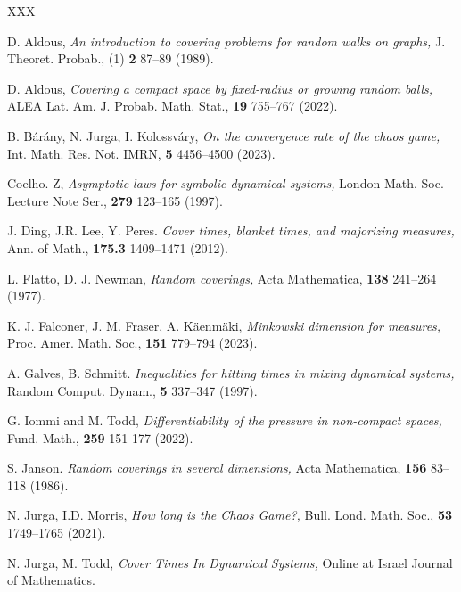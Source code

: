 \documentclass[11pt, reqno]{amsart}
\theoremstyle{plain}%
\theoremstyle{definition}
\theoremstyle{definition}
\numberwithin{equation}{section}
\begin{document}
\begin{thebibliography}{XXX}




D. Aldous, \emph{An introduction to covering problems for random walks on graphs,} J. Theoret. Probab., (1) \textbf{2} 87–89 (1989).

D. Aldous, \emph{Covering a compact space by fixed-radius or growing random balls,} ALEA Lat. Am. J. Probab.
Math. Stat., \textbf{19} 755–767 (2022).


B. Bárány, N. Jurga, I. Kolossváry, \emph{On the convergence rate of the chaos game,} Int. Math. Res. Not. IMRN, \textbf{5} 4456–4500 (2023).


Coelho. Z, \emph{Asymptotic laws for
symbolic dynamical systems,} London Math. Soc.
Lecture Note Ser.,  \textbf{279} 123–165 (1997).


J. Ding, J.R. Lee, Y. Peres. \emph{Cover times, blanket times, and majorizing measures,} Ann. of Math., \textbf{175.3} 1409–1471 (2012).

L. Flatto, D. J. Newman, \emph{Random coverings,} Acta Mathematica, \textbf{138} 241–264 (1977).


K. J. Falconer, J. M. Fraser, A. Käenmäki, \emph{Minkowski dimension for measures,} Proc. Amer. Math. Soc., \textbf{151} 779–794 (2023).


A. Galves, B. Schmitt. \emph{Inequalities for hitting times in mixing dynamical systems,} Random Comput. Dynam., \textbf{5} 337–347 (1997).


G. Iommi and M. Todd, \textit{Differentiability of the pressure in non-compact spaces,}  Fund. Math., \textbf{259} 151-177 (2022).


S. Janson. \emph{Random coverings in several dimensions,} Acta Mathematica, \textbf{156} 83–118 (1986).

N. Jurga, I.D. Morris, \emph{How long is the Chaos Game?,} Bull. Lond. Math. Soc., \textbf{53} 1749–1765 (2021).


N. Jurga, M. Todd, \emph{Cover Times In Dynamical Systems,} Online at Israel Journal of Mathematics.



\end{thebibliography}
\end{document}
